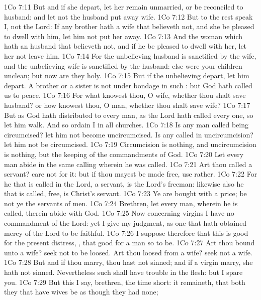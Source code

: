 \vs 1Co 7:11 But and if she depart, let her remain unmarried, or be reconciled to  husband: and let not the husband put away  wife.
\vs 1Co 7:12 But to the rest speak I, not the Lord: If any brother hath a wife that believeth not, and she be pleased to dwell with him, let him not put her away.
\vs 1Co 7:13 And the woman which hath an husband that believeth not, and if he be pleased to dwell with her, let her not leave him.
\vs 1Co 7:14 For the unbelieving husband is sanctified by the wife, and the unbelieving wife is sanctified by the husband: else were your children unclean; but now are they holy.
\vs 1Co 7:15 But if the unbelieving depart, let him depart. A brother or a sister is not under bondage in such : but God hath called us to peace.
\vs 1Co 7:16 For what knowest thou, O wife, whether thou shalt save  husband? or how knowest thou, O man, whether thou shalt save  wife?
\vs 1Co 7:17 But as God hath distributed to every man, as the Lord hath called every one, so let him walk. And so ordain I in all churches.
\vs 1Co 7:18 Is any man called being circumcised? let him not become uncircumcised. Is any called in uncircumcision? let him not be circumcised.
\vs 1Co 7:19 Circumcision is nothing, and uncircumcision is nothing, but the keeping of the commandments of God.
\vs 1Co 7:20 Let every man abide in the same calling wherein he was called.
\vs 1Co 7:21 Art thou called  a servant? care not for it: but if thou mayest be made free, use  rather.
\vs 1Co 7:22 For he that is called in the Lord,  a servant, is the Lord's freeman: likewise also he that is called,  free, is Christ's servant.
\vs 1Co 7:23 Ye are bought with a price; be not ye the servants of men.
\vs 1Co 7:24 Brethren, let every man, wherein he is called, therein abide with God.
\vs 1Co 7:25 Now concerning virgins I have no commandment of the Lord: yet I give my judgment, as one that hath obtained mercy of the Lord to be faithful.
\vs 1Co 7:26 I suppose therefore that this is good for the present distress, , that  good for a man so to be.
\vs 1Co 7:27 Art thou bound unto a wife? seek not to be loosed. Art thou loosed from a wife? seek not a wife.
\vs 1Co 7:28 But and if thou marry, thou hast not sinned; and if a virgin marry, she hath not sinned. Nevertheless such shall have trouble in the flesh: but I spare you.
\vs 1Co 7:29 But this I say, brethren, the time  short: it remaineth, that both they that have wives be as though they had none;
